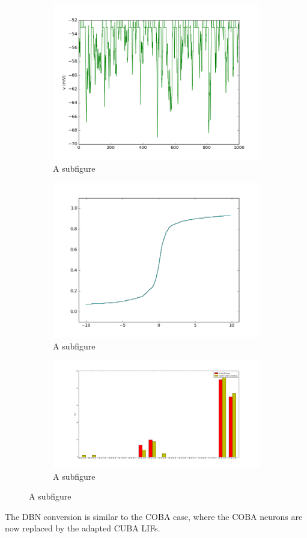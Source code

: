 \begin{figure}
	\centering
	\begin{subfigure}[t]{.5\textwidth}
  		\centering
  		\includegraphics[width=.8\linewidth]{imgs/cuba_lif_act.png}
  		\caption{A subfigure}
  		\label{fig:sub1}
	\end{subfigure}%
	\begin{subfigure}[t]{.5\textwidth}
  		\centering
  		\includegraphics[width=.8\linewidth]{imgs/cuba_lif_sigmoid.png}
  		\caption{A subfigure}
  		\label{fig:sub2}
	\end{subfigure}
	\begin{subfigure}[t]{.5\textwidth}
  		\centering
  		\includegraphics[width=.8\linewidth]{imgs/cuba_lif_bm.png}
  		\caption{A subfigure}
  		\label{fig:sub2}
	\end{subfigure}
\end{figure}
The DBN conversion is similar to the COBA case, where the COBA neurons are now replaced by the adapted CUBA LIFs.

